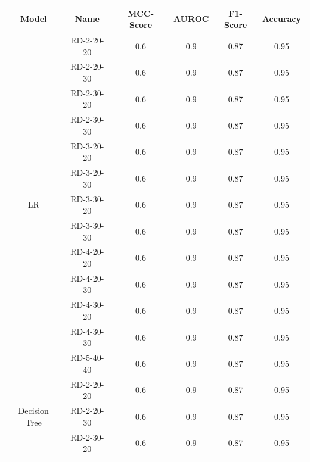 \begin{table}[ht]
    \centering
    \begin{tabular}{c c c c c c}
        \toprule
        Model                           & Name       & \gls{MCC}-Score & \gls{AUROC} & F1-Score & Accuracy \\
        \midrule
        \multirow{13}{*}{\gls{LR}}      & RD-2-20-20 & 0.6             & 0.9         & 0.87     & 0.95     \\
                                        & RD-2-20-30 & 0.6             & 0.9         & 0.87     & 0.95     \\
                                        & RD-2-30-20 & 0.6             & 0.9         & 0.87     & 0.95     \\
                                        & RD-2-30-30 & 0.6             & 0.9         & 0.87     & 0.95     \\
                                        & RD-3-20-20 & 0.6             & 0.9         & 0.87     & 0.95     \\
                                        & RD-3-20-30 & 0.6             & 0.9         & 0.87     & 0.95     \\
                                        & RD-3-30-20 & 0.6             & 0.9         & 0.87     & 0.95     \\
                                        & RD-3-30-30 & 0.6             & 0.9         & 0.87     & 0.95     \\
                                        & RD-4-20-20 & 0.6             & 0.9         & 0.87     & 0.95     \\
                                        & RD-4-20-30 & 0.6             & 0.9         & 0.87     & 0.95     \\
                                        & RD-4-30-20 & 0.6             & 0.9         & 0.87     & 0.95     \\
                                        & RD-4-30-30 & 0.6             & 0.9         & 0.87     & 0.95     \\
                                        & RD-5-40-40 & 0.6             & 0.9         & 0.87     & 0.95     \\
        \midrule
        \multirow{13}{*}{Decision Tree} & RD-2-20-20 & 0.6             & 0.9         & 0.87     & 0.95     \\
                                        & RD-2-20-30 & 0.6             & 0.9         & 0.87     & 0.95     \\
                                        & RD-2-30-20 & 0.6             & 0.9         & 0.87     & 0.95     \\

\end{tabular}
\end{table}
